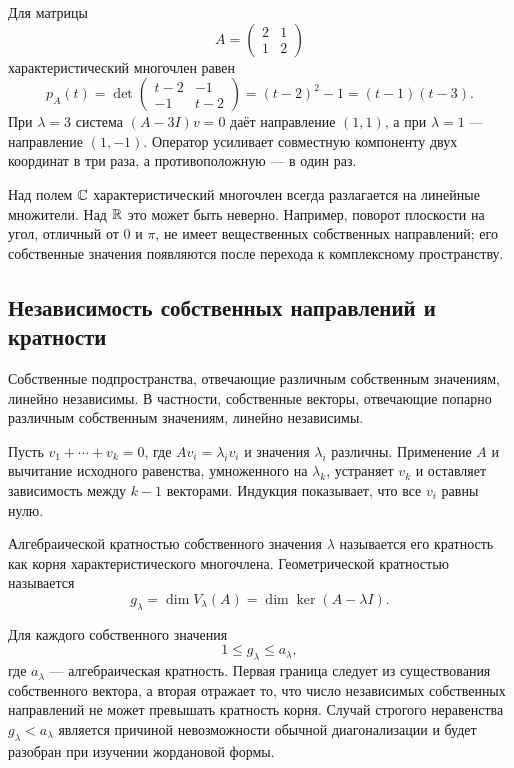 \begin{example}
Для матрицы
\[
A=
\begin{pmatrix}
2&1\\
1&2
\end{pmatrix}
\]
характеристический многочлен равен
\[
p_A(t)=
\det
\begin{pmatrix}
t-2&-1\\
-1&t-2
\end{pmatrix}
=(t-2)^2-1=(t-1)(t-3).
\]
При $\lambda=3$ система $(A-3I)v=0$ даёт направление $(1,1)$, а при $\lambda=1$ --- направление $(1,-1)$. Оператор усиливает совместную компоненту двух координат в три раза, а противоположную --- в один раз.
\end{example}

Над полем $\mathbb{C}$ характеристический многочлен всегда разлагается на линейные множители. Над $\mathbb{R}$ это может быть неверно. Например, поворот плоскости на угол, отличный от $0$ и $\pi$, не имеет вещественных собственных направлений; его собственные значения появляются после перехода к комплексному пространству.

\subsection{Независимость собственных направлений и кратности}

\begin{theorem}
Собственные подпространства, отвечающие различным собственным значениям, линейно независимы. В частности, собственные векторы, отвечающие попарно различным собственным значениям, линейно независимы.
\end{theorem}

\begin{proofidea}
Пусть $v_1+\cdots+v_k=0$, где $Av_i=\lambda_i v_i$ и значения $\lambda_i$ различны. Применение $A$ и вычитание исходного равенства, умноженного на $\lambda_k$, устраняет $v_k$ и оставляет зависимость между $k-1$ векторами. Индукция показывает, что все $v_i$ равны нулю.
\end{proofidea}

\begin{definition}
Алгебраической кратностью собственного значения $\lambda$ называется его кратность как корня характеристического многочлена. Геометрической кратностью называется
\[
g_\lambda=\dim V_\lambda(A)=\dim\ker(A-\lambda I).
\]
\end{definition}

Для каждого собственного значения
\[
1\leq g_\lambda\leq a_\lambda,
\]
где $a_\lambda$ --- алгебраическая кратность. Первая граница следует из существования собственного вектора, а вторая отражает то, что число независимых собственных направлений не может превышать кратность корня. Случай строгого неравенства $g_\lambda<a_\lambda$ является причиной невозможности обычной диагонализации и будет разобран при изучении жордановой формы.

